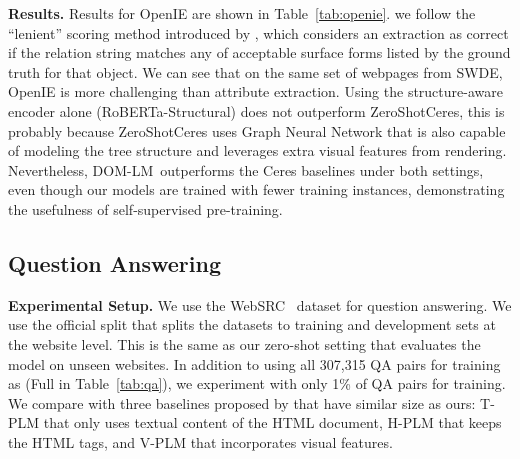 \documentclass[sigconf, nonacm]{acmart}
\newcommand{\ours}[0]{DOM-LM}
\begin{document}
\vspace{0.1em}
\noindent\textbf{Results.}
Results for OpenIE are shown in Table~\ref{tab:openie}. we follow the “lenient” scoring method introduced by \citet{lockard-etal-2019-openceres}, which considers an extraction as correct if the relation string matches any of acceptable surface forms listed by the ground truth for that object. We can see that on the same set of webpages from SWDE, OpenIE is more challenging than attribute extraction. Using the structure-aware encoder alone (RoBERTa-Structural) does not outperform ZeroShotCeres, this is probably because ZeroShotCeres uses Graph Neural Network that is also capable of modeling the tree structure and leverages extra visual features from rendering. Nevertheless, \ours\ outperforms the Ceres baselines under both settings, even though our models are trained with fewer training instances, demonstrating the usefulness of self-supervised pre-training.

\begin{table}[]
    \centering
    \caption{QA results. Since the test set for WebSRC~\cite{chen2021websrc} has not been released, here we report results on the development set.}\vspace{-10pt}
    \vspace{-10pt}
    \label{tab:qa}
\end{table} \subsection{Question Answering}
\noindent\textbf{Experimental Setup.}
We use the WebSRC~\cite{chen2021websrc} dataset for question answering. We use the official split that splits the datasets to training and development sets at the website level. This is the same as our zero-shot setting that evaluates the model on unseen websites. In addition to using all 307,315 QA pairs for training as \citet{chen2021websrc} (Full in Table~\ref{tab:qa}), we experiment with only 1\% of QA pairs for training. We compare with three baselines proposed by \citet{chen2021websrc} that have similar size as ours: T-PLM that only uses textual content of the HTML document, H-PLM that keeps the HTML tags, and V-PLM that incorporates visual features.
\end{document}
